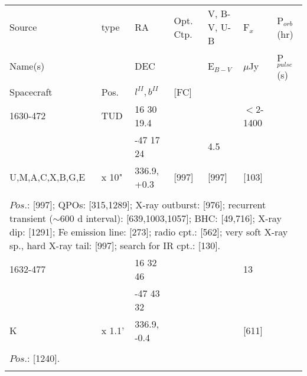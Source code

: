 \documentclass{aa}
\begin{document}

\begin{tabular}{p{2.5cm}p{1cm}p{1.8cm}p{2.3cm}p{3.3cm}p{2.0cm}p{2.2cm}}
\noalign{\smallskip}
\multicolumn{7}{p{17.5cm}}{Table 1.  (continued) }\\        
\hline
\noalign{\smallskip}
Source           & type  & RA                       &  Opt. Ctp. & V, B-V, U-B  & F$_{x}$          & P$_{orb}$(hr)    \\
Name(s)         &            & DEC                    &                     & E$_{B-V}$   & $\mu$Jy        & P$_{pulse}$(s) \\
Spacecraft   & Pos.  & $l^{II}, b^{II}$      &  [FC]           &                       &                         &                             \\
\noalign{\smallskip} 
\hline

\noalign{\smallskip}
1630-472                & TUD      & 16 30 19.4         &                    &                        & $<$2-1400   &          \\
                                 &                & -47 17 24           &                    & 4.5                 &                       &    \\
U,M,A,C,X,B,G,E  & x 10"     & 336.9, +0.3        & [997]         & [997]              & [103]              &         \\
\\
\multicolumn{7}{p{17.5cm}}{
$Pos$.: [997]; QPOs: [315,1289]; X-ray outburst: [976]; recurrent transient ($\sim$600 d interval): [639,1003,1057]; 
BHC: [49,716]; X-ray dip: [1291]; Fe emission line: [273]; radio cpt.: [562]; very soft X-ray sp., hard X-ray tail: [997]; 
search for IR cpt.: [130].}\\
\noalign{\smallskip}
\hline

\noalign{\smallskip}
1632-477        &              & 16 32 46             &                         &                            & 13         &          \\
                         &              & -47 43 32            &                         &                            &               &         \\
K                      & x 1.1'     & 336.9, -0.4          &                         &                            & [611]     &          \\
\\
\multicolumn{7}{p{17.5cm}}{
$Pos$.: [1240].}\\
\noalign{\smallskip}
\hline


\end{tabular}
\end{document}
